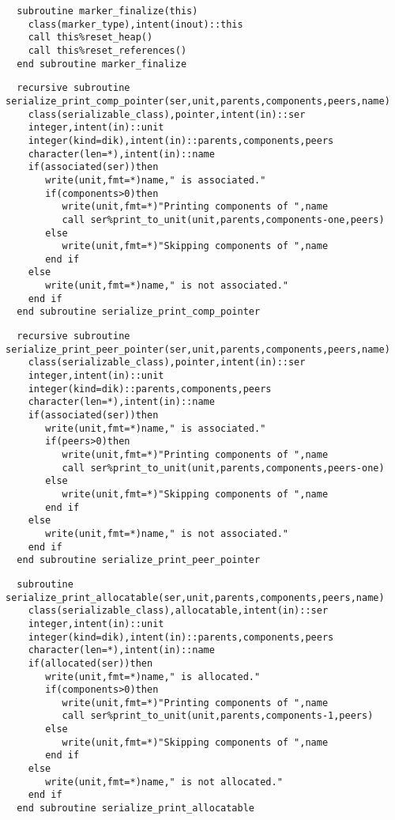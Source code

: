 \begin{Verbatim}
  subroutine marker_finalize(this)
    class(marker_type),intent(inout)::this
    call this%reset_heap()
    call this%reset_references()
  end subroutine marker_finalize
\end{Verbatim}
\MethodsNTB
{}
\begin{Verbatim}
  recursive subroutine serialize_print_comp_pointer(ser,unit,parents,components,peers,name)
    class(serializable_class),pointer,intent(in)::ser
    integer,intent(in)::unit
    integer(kind=dik),intent(in)::parents,components,peers
    character(len=*),intent(in)::name
    if(associated(ser))then
       write(unit,fmt=*)name," is associated."
       if(components>0)then
          write(unit,fmt=*)"Printing components of ",name
          call ser%print_to_unit(unit,parents,components-one,peers)
       else
          write(unit,fmt=*)"Skipping components of ",name
       end if
    else
       write(unit,fmt=*)name," is not associated."
    end if
  end subroutine serialize_print_comp_pointer
\end{Verbatim}

\begin{Verbatim}
  recursive subroutine serialize_print_peer_pointer(ser,unit,parents,components,peers,name)
    class(serializable_class),pointer,intent(in)::ser
    integer,intent(in)::unit
    integer(kind=dik)::parents,components,peers
    character(len=*),intent(in)::name
    if(associated(ser))then
       write(unit,fmt=*)name," is associated."
       if(peers>0)then
          write(unit,fmt=*)"Printing components of ",name
          call ser%print_to_unit(unit,parents,components,peers-one)
       else
          write(unit,fmt=*)"Skipping components of ",name
       end if
    else
       write(unit,fmt=*)name," is not associated."
    end if
  end subroutine serialize_print_peer_pointer
\end{Verbatim}

\begin{Verbatim}
  subroutine serialize_print_allocatable(ser,unit,parents,components,peers,name)
    class(serializable_class),allocatable,intent(in)::ser
    integer,intent(in)::unit
    integer(kind=dik),intent(in)::parents,components,peers
    character(len=*),intent(in)::name
    if(allocated(ser))then
       write(unit,fmt=*)name," is allocated."
       if(components>0)then
          write(unit,fmt=*)"Printing components of ",name
          call ser%print_to_unit(unit,parents,components-1,peers)
       else
          write(unit,fmt=*)"Skipping components of ",name
       end if
    else
       write(unit,fmt=*)name," is not allocated."
    end if
  end subroutine serialize_print_allocatable
\end{Verbatim}

